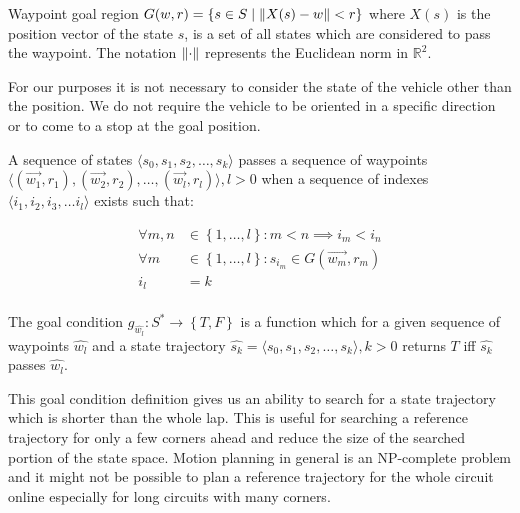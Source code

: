\begin{defn}[Waypoint]
	Waypoint goal region $G(w,r)=\left\{s\in S \mid \left\lVert X(s)-w\right\rVert<r\right\}$ where $X(s)$ is the position vector of the state $s$, is a set of all states which are considered to pass the waypoint. The notation $\left\lVert\cdot\right\rVert$ represents the Euclidean norm in $\mathbb{R}^2$.
\end{defn}
	
For our purposes it is not necessary to consider the state of the vehicle other than the position. We do not require the vehicle to be oriented in a specific direction or to come to a stop at the goal position.

\begin{defn}
	A sequence of states $\langle s_0,s_1,s_2,\ldots,s_k\rangle$ passes a sequence of waypoints $\langle \left(\vec{w_1}, r_1\right), \left(\vec{w_2}, r_2\right), \ldots, \left(\vec{w_l}, r_l\right) \rangle, l > 0$ when a sequence of indexes $\langle i_1,i_2,i_3, \ldots i_l \rangle$ exists such that:

	\begin{equation*}
		\begin{aligned}
			\forall m,n &\in \left\{1,\ldots,l\right\}: m<n\implies i_m < i_n \\
			\forall m &\in \left\{1,\ldots,l\right\}: s_{i_m}\in G(\vec{w_m}, r_m) \\
			i_l &= k \\
		\end{aligned}
	\end{equation*}
\end{defn}

\begin{defn}
	The goal condition $g_{\hat{w_l}}: S^* \rightarrow \left\{T,F\right\}$ is a function which for a given sequence of waypoints $\hat{w_l}$ and a state trajectory  $\hat{s_k}=\langle s_0,s_1,s_2,\ldots, s_k\rangle, k>0$ returns $T$ iff $\hat{s_k}$ passes $\hat{w_l}$.
\end{defn}
	
This goal condition definition gives us an ability to search for a state trajectory which is shorter than the whole lap. This is useful for searching a reference trajectory for only a few corners ahead and reduce the size of the searched portion of the state space. Motion planning in general is an NP-complete problem \cite[Section~6.5]{lavalle_2006} and it might not be possible to plan a reference trajectory for the whole circuit online especially for long circuits with many corners.

